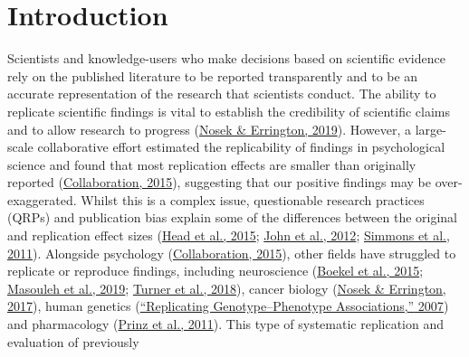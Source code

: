 \documentclass[]{cik}%
\begin{document}
\maketitle

\newpage

\captionsetup[table]{labelformat=empty}
\captionsetup[figure]{labelformat=empty}
\raggedbottom

\hypertarget{introduction}{%
\section{Introduction}\label{introduction}}

Scientists and knowledge-users who make decisions based on scientific
evidence rely on the published literature to be reported transparently
and to be an accurate representation of the research that scientists
conduct. The ability to replicate scientific findings is vital to
establish the credibility of scientific claims and to allow research to
progress (\protect\hyperlink{ref-NosekErrington2019}{Nosek \& Errington,
2019}). However, a large-scale collaborative effort estimated the
replicability of findings in psychological science and found that most
replication effects are smaller than originally reported
(\protect\hyperlink{ref-collaboration_estimating_2015}{Collaboration,
2015}), suggesting that our positive findings may be over-exaggerated.
Whilst this is a complex issue, questionable research practices (QRPs)
and publication bias explain some of the differences between the
original and replication effect sizes
(\protect\hyperlink{ref-head_extent_2015}{Head et al., 2015};
\protect\hyperlink{ref-John_Loewenstein_Prelec_2012}{John et al., 2012};
\protect\hyperlink{ref-simmons_false-positive_2011}{Simmons et al.,
2011}). Alongside psychology
(\protect\hyperlink{ref-collaboration_estimating_2015}{Collaboration,
2015}), other fields have struggled to replicate or reproduce findings,
including neuroscience
(\protect\hyperlink{ref-Boekel_Wagenmakers_Belay_Verhagen_Brown_Forstmann_2015}{Boekel
et al., 2015}; \protect\hyperlink{ref-Kharabian_Genon_2019}{Masouleh et
al., 2019};
\protect\hyperlink{ref-Turner_Paul_Miller_Barbey_2018}{Turner et al.,
2018}), cancer biology
(\protect\hyperlink{ref-Nosek_Errington_2017}{Nosek \& Errington,
2017}), human genetics
(\protect\hyperlink{ref-chanock_2007}{{``Replicating Genotype--Phenotype
Associations,''} 2007}) and pharmacology
(\protect\hyperlink{ref-Prinz_Schlange_Asadullah_2011}{Prinz et al.,
2011}). This type of systematic replication and evaluation of previously
\end{document}

